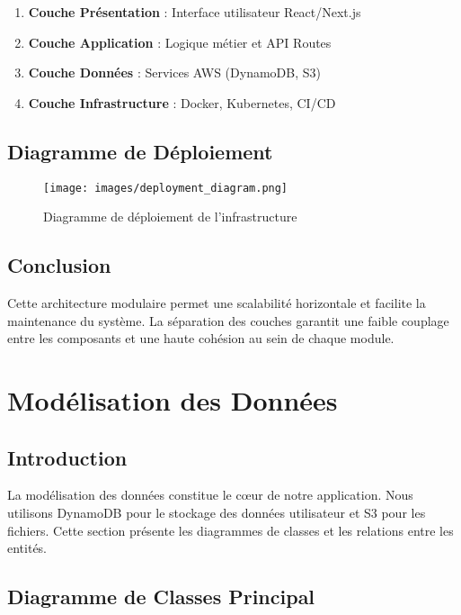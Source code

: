 \begin{enumerate}
    \item \textbf{Couche Présentation} : Interface utilisateur React/Next.js
    \item \textbf{Couche Application} : Logique métier et API Routes
    \item \textbf{Couche Données} : Services AWS (DynamoDB, S3)
    \item \textbf{Couche Infrastructure} : Docker, Kubernetes, CI/CD
\end{enumerate}

\subsection{Diagramme de Déploiement}

\begin{figure}[H]
    \centering
    \texttt{[image: images/deployment\_diagram.png]}
    \caption{Diagramme de déploiement de l'infrastructure}
    \label{fig:deployment_diagram}
\end{figure}

\subsection{Conclusion}

Cette architecture modulaire permet une scalabilité horizontale et facilite la maintenance du système. La séparation des couches garantit une faible couplage entre les composants et une haute cohésion au sein de chaque module.

\section{Modélisation des Données}

\subsection{Introduction}

La modélisation des données constitue le cœur de notre application. Nous utilisons DynamoDB pour le stockage des données utilisateur et S3 pour les fichiers. Cette section présente les diagrammes de classes et les relations entre les entités.

\subsection{Diagramme de Classes Principal}

